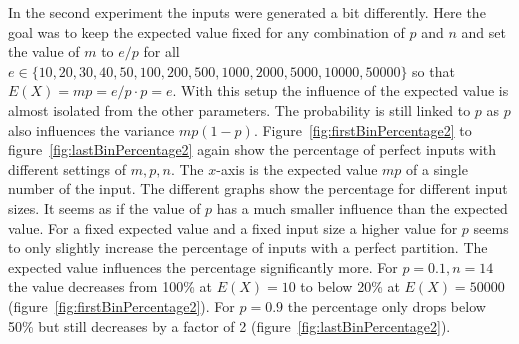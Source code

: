 In the second experiment the inputs were generated a bit differently.
Here the goal was to keep the expected value fixed for any combination of $p$ and $n$ and set the value of $m$ to $e/p$ for all $e \in \{10, 20, 30, 40, 50, 100, 200, 500, 1000, 2000, 5000, 10000, 50000\}$ so that $E(X)=mp=e/p\cdot p=e$.
With this setup the influence of the expected value is almost isolated from the other parameters.
The probability is still linked to $p$ as $p$ also influences the variance $mp(1-p)$.\newline
Figure~\ref{fig:firstBinPercentage2} to figure~\ref{fig:lastBinPercentage2} again show the percentage of perfect inputs with different settings of $m,p,n$.
The $x$-axis is the expected value $mp$ of a single number of the input. The different graphs show the percentage for different input sizes.
It seems as if the value of $p$ has a much smaller influence than the expected value.
For a fixed expected value and a fixed input size a higher value for $p$ seems to only slightly increase the percentage of inputs with a perfect partition.
The expected value influences the percentage significantly more.
For $p=0.1, n=14$ the value decreases from 100\% at $E(X)=10$ to below 20\% at $E(X)=50000$ (figure~\ref{fig:firstBinPercentage2}).
For $p=0.9$ the percentage only drops below 50\% but still decreases by a factor of 2 (figure~\ref{fig:lastBinPercentage2}).

